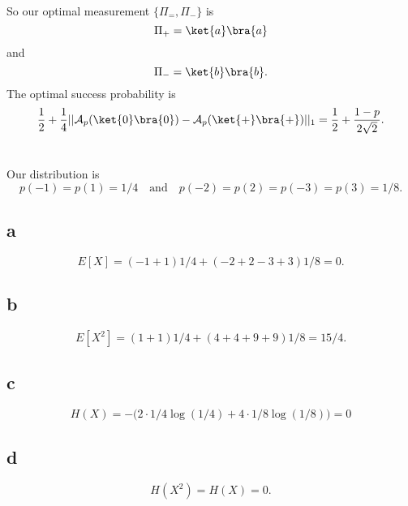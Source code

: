 \documentclass[letterpaper,12pt,oneside,onecolumn]{article}
\newcommand{\cA}{\mathcal{A}} \newcommand{\cB}{\mathcal{B}}
\begin{document}
\paragraph{}
So our optimal measurement $\{\Pi_=, \Pi_-\}$ is
$$\Pi_+ = \ket{a}\bra{a}$$
and
$$\Pi_- = \ket{b}\bra{b}.$$
The optimal success probability is
$$\frac{1}{2} + \frac{1}{4}||\cA_p(\ket{0}\bra{0}) - \cA_p(\ket{+}\bra{+})||_1 = \frac{1}{2} +\frac{1-p}{2\sqrt{2}}. $$
\section{}
Our distribution is 
$$p(-1)=p(1) = 1/4 \quad\text{and}\quad p(-2)=p(2)=p(-3)=p(3)=1/8.$$
\subsection{a}
$$E[X] = (-1 + 1)1/4 + (-2+2-3+3)1/8 = 0.$$
\subsection{b}
$$E[X^2] = (1+1)1/4 + (4+4+9+9)1/8 = 15/4.$$
\subsection{c}
$$H(X) = -\big( 2\cdot 1/4\log(1/4) + 4\cdot 1/8\log(1/8)  \big) = 0$$
\subsection{d}
$$H(X^2) = H(X) = 0.$$
\end{document}
